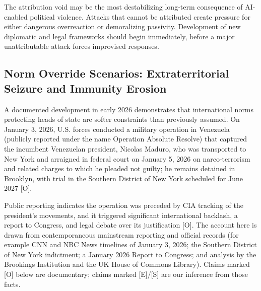\documentclass[11pt,letterpaper]{article}
\makeatletter
\newcommand{\etraneed}[1]{\par\if@nobreak\else\penalty\z@\ifdim\pagegoal<\maxdimen\ifdim\dimexpr\pagegoal-\pagetotal\relax<\dimexpr#1\relax\newpage\fi\fi\fi}
\makeatother
\begin{document}
\etraneed{10\baselineskip}
\begin{warnbox}[Assessment]
The attribution void may be the most destabilizing long-term consequence of AI-enabled political violence. Attacks that cannot be attributed create pressure for either dangerous overreaction or demoralizing passivity. Development of new diplomatic and legal frameworks should begin immediately, before a major unattributable attack forces improvised responses.
\end{warnbox}

\subsection{Norm Override Scenarios: Extraterritorial Seizure and Immunity Erosion}

A documented development in early 2026 demonstrates that international norms protecting heads of state are softer constraints than previously assumed. On January 3, 2026, U.S. forces conducted a military operation in Venezuela (publicly reported under the name Operation Absolute Resolve) that captured the incumbent Venezuelan president, Nicolas Maduro, who was transported to New York and arraigned in federal court on January 5, 2026 on narco-terrorism and related charges to which he pleaded not guilty; he remains detained in Brooklyn, with trial in the Southern District of New York scheduled for June 2027 [O].

Public reporting indicates the operation was preceded by CIA tracking of the president's movements, and it triggered significant international backlash, a report to Congress, and legal debate over its justification [O]. The account here is drawn from contemporaneous mainstream reporting and official records (for example CNN and NBC News timelines of January 3, 2026; the Southern District of New York indictment; a January 2026 Report to Congress; and analysis by the Brookings Institution and the UK House of Commons Library). Claims marked [O] below are documentary; claims marked [E]/[S] are our inference from those facts.
\end{document}
